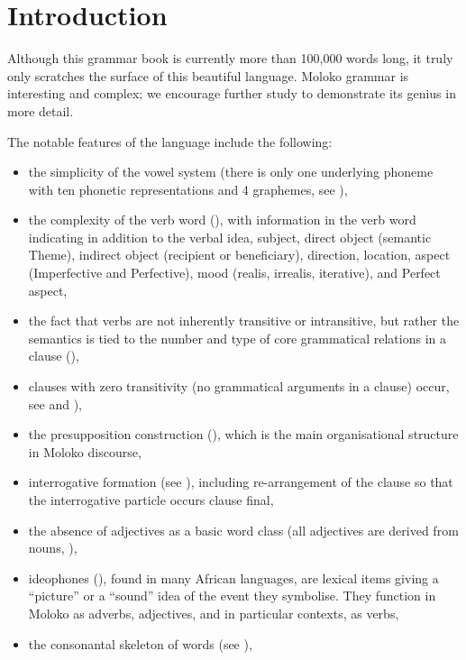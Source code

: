 \chapter[Introduction]{Introduction}\label{chap:1}\label{introduction}
\hypertarget{RefHeading1210241525720847}{}\hypertarget{Toc450584435}{}

Although this grammar book is currently more than 100,000 words long, it truly only scratches the surface of this beautiful language. Moloko grammar is interesting and complex; we encourage further study  to demonstrate its genius in more detail. 

The notable features of the language include the following:

\begin{itemize}
\item the simplicity of the vowel system (there is only one underlying phoneme with ten phonetic representations and 4 graphemes, see ), 
\item the complexity of the verb word (), with information in the verb word indicating in addition to the verbal idea, subject, direct object (semantic Theme), indirect object (recipient or beneficiary), direction, location, aspect (Imperfective and Perfective), mood (realis, irrealis, iterative), and Perfect aspect, 
\item  the fact that verbs are not inherently transitive or intransitive, but rather the semantics is tied to the number and type of core grammatical relations in a clause (), 
\item clauses with zero transitivity (no grammatical arguments in a clause) occur, see  and ),  
\item the presupposition construction (), which is the main organisational structure in Moloko discourse, 
\item interrogative formation (see ), including re-arrangement of the clause so that the interrogative particle occurs clause final,
\item the absence of adjectives as a basic word class (all adjectives are derived from nouns, ),
\item ideophones (), found in many African languages, are lexical items giving a ``picture'' or a ``sound'' idea of the event they symbolise. They function in Moloko as adverbs, adjectives, and in particular contexts, as verbs, 
\item the consonantal skeleton of words (see ), 

\end{itemize}
